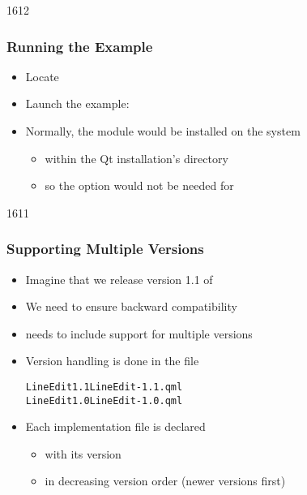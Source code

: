 
\begin{slide}{1612}\frametitle{Running the Example}

\begin{itemize}
\item Locate 
\item Launch the example:\\
\end{itemize}

\begin{itemize}
\item Normally, the module would be installed on the system
  \begin{itemize}
  \item within the Qt installation's  directory
  \item so the  option would not be needed for 
  \end{itemize}
\end{itemize}

\end{slide}


\begin{slide}{1611}\frametitle{Supporting Multiple Versions}

\begin{itemize}
\item Imagine that we release version 1.1 of 
\item We need to ensure backward compatibility
\item {} needs to include support for multiple versions
\item Version handling is done in the  file

\begin{alltt}
LineEdit 1.1 LineEdit-1.1.qml\\
LineEdit 1.0 LineEdit-1.0.qml
\end{alltt}

\item Each implementation file is declared
  \begin{itemize}
  \item with its version
  \item in decreasing version order (newer versions first)
  \end{itemize}
\end{itemize}

\end{slide}


